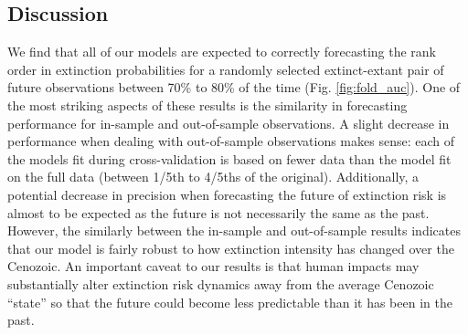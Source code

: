 \documentclass[12pt,letterpaper]{article}
\begin{document}
\begin{refsection}
%
%
%



\section{Discussion}

We find that all of our models are expected to correctly forecasting the rank order in extinction probabilities for a randomly selected extinct-extant pair of future observations between 70\% to 80\% of the time (Fig. \ref{fig:fold_auc}). One of the most striking aspects of these results is the similarity in forecasting performance for in-sample and out-of-sample observations. A slight decrease in performance when dealing with out-of-sample observations makes sense: each of the models fit during cross-validation is based on fewer data than the model fit on the full data (between 1/5th to 4/5ths of the original). Additionally, a potential decrease in precision when forecasting the future of extinction risk is almost to be expected as the future is not necessarily the same as the past. However, the similarly between the in-sample and out-of-sample results indicates that our model is fairly robust to how extinction intensity has changed over the Cenozoic. An important caveat to our results is that human impacts may substantially alter extinction risk dynamics away from the average Cenozoic ``state'' so that the future could become less predictable than it has been in the past.


\end{refsection}
\end{document}
